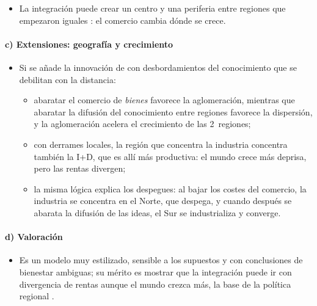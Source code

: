 \documentclass[11pt]{article}
\begin{document}
\begin{itemize}
\item La integración puede crear un centro y una periferia entre regiones que empezaron iguales : el comercio cambia dónde se crece.
\end{itemize}

\paragraph{c) Extensiones: geografía y crecimiento}

\begin{itemize}
\item Si se añade la innovación de  con desbordamientos del conocimiento que se debilitan con la distancia:
  \begin{itemize}
  \item abaratar el comercio de \emph{bienes} favorece la aglomeración, mientras que abaratar la difusión del conocimiento entre regiones favorece la dispersión, y la aglomeración acelera el crecimiento de las 2~regiones\nocite{BaldwinForslid2000Core};
  \item con derrames locales, la región que concentra la industria concentra también la I+D, que es allí más productiva: el mundo crece más deprisa, pero las rentas divergen\nocite{MartinOttaviano1999Growing};
  \item la misma lógica explica los despegues: al bajar los costes del comercio, la industria se concentra en el Norte, que despega, y cuando después se abarata la difusión de las ideas, el Sur se industrializa y converge\nocite{BaldwinMartinOttaviano2001Global}.
  \end{itemize}
\end{itemize}

\paragraph{d) Valoración}

\begin{itemize}
\item Es un modelo muy estilizado, sensible a los supuestos y con conclusiones de bienestar ambiguas; su mérito es mostrar que la integración puede ir con divergencia de rentas aunque el mundo crezca más, la base de la política regional .
\end{itemize}

\end{document}
